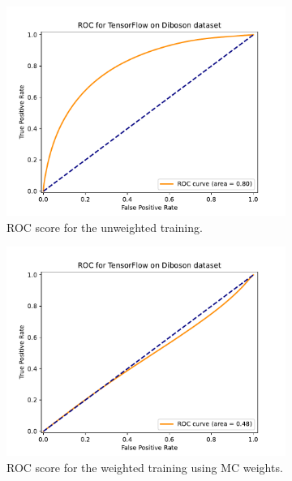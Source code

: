 \documentclass[14pt, a4paper]{book}
\begin{document}
\begin{figure}[!ht]
	\centering
	\begin{subfigure}[b]{0.49\textwidth}
        \centering
        \includegraphics[width=1\textwidth]{Unweighted/ROC.pdf}
        \caption{ROC score for the unweighted training.}\label{fig:DibosonROCUW}
     \end{subfigure}
     \hfill
     \begin{subfigure}[b]{0.49\textwidth}
        \centering
        \includegraphics[width=1\textwidth]{Weighted/ROC.pdf}
        \caption{ROC score for the weighted training using MC weights.}\label{fig:DibosonROCMC}
     \end{subfigure}
     \begin{subfigure}[b]{0.49\textwidth}

\end{subfigure}
\end{figure}
\end{document}
